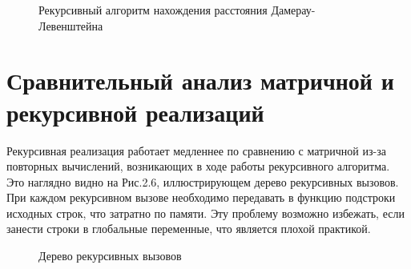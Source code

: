 \documentclass[a4paper,12pt]{report}
\begin{document}
\begin{figure}[ht!]
\caption{Рекурсивный алгоритм нахождения расстояния Дамерау-Левенштейна}
\end{figure}
\newpage
\section{Сравнительный анализ матричной и рекурсивной реализаций}
Рекурсивная реализация работает медленнее по сравнению с матричной из-за повторных вычислений, возникающих в ходе работы рекурсивного алгоритма. Это наглядно видно на Рис.2.6, иллюстрирующем дерево рекурсивных вызовов. При каждом рекурсивном вызове необходимо передавать в функцию подстроки исходных строк, что затратно по памяти. Эту проблему возможно избежать, если занести строки в глобальные переменные, что является плохой практикой. 

\begin{figure}[ht!]
\caption{Дерево рекурсивных вызовов}
\end{figure}
\end{document}
